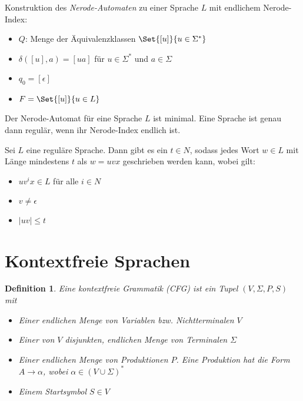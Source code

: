\documentclass{cheat-sheet}
\newtheorem*{definition}{Definition}
\begin{document}
\begin{alg}
Konstruktion des \emph{Nerode-Automaten} zu einer Sprache $L$ mit endlichem Nerode-Index:
\end{alg}

\begin{itemize}
  \item $Q$: Menge der Äquivalenzklassen $\Set{[u]}{u \in \Sigma^{*}}$
  \item $\delta([u], a) = [ua]$ für $u \in \Sigma^{*}$ und $a \in \Sigma$
  \item $q_{0} = [ \epsilon ]$
  \item $F = \Set{ [u] }{ u \in L }$
\end{itemize}

\begin{bem}
Der Nerode-Automat für eine Sprache $L$ ist minimal. Eine Sprache ist genau dann regulär, wenn ihr Nerode-Index endlich ist.
\end{bem}

\begin{satz}
Sei $L$ eine reguläre Sprache. Dann gibt es ein $t \in N$, sodass jedes Wort $w \in L$ mit Länge mindestens $t$ als $w = uvx$ geschrieben werden kann, wobei gilt:
\end{satz}

\begin{itemize}
  \item $uv^{i}x \in L$ für alle $i \in N$
  \item $v \neq \epsilon$
  \item $|uv| \le t$
\end{itemize}



\section{Kontextfreie Sprachen}

\begin{definition}
Eine \emph{kontextfreie Grammatik} (CFG) ist ein Tupel $(V, \Sigma, P, S)$ mit

\begin{itemize}
  \item Einer endlichen Menge von Variablen bzw. Nichtterminalen $V$
  \item Einer von $V$ disjunkten, endlichen Menge von Terminalen $\Sigma$
  \item Einer endlichen Menge von Produktionen $P$. Eine Produktion hat die Form $A \longrightarrow \alpha$, wobei $\alpha \in (V \cup \Sigma)^{*}$
  \item Einem Startsymbol $S \in V$
\end{itemize}
\end{definition}
\end{document}

